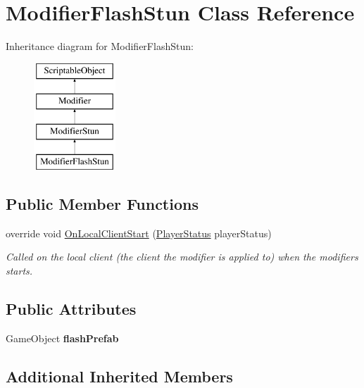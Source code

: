 \hypertarget{class_modifier_flash_stun}{}\section{Modifier\+Flash\+Stun Class Reference}
\label{class_modifier_flash_stun}
Inheritance diagram for Modifier\+Flash\+Stun\+:\begin{figure}[H]
\begin{center}
\leavevmode
\includegraphics[height=4.000000cm]{class_modifier_flash_stun}
\end{center}
\end{figure}
\subsection*{Public Member Functions}
\begin{DoxyCompactItemize}
\item 
override void \hyperlink{class_modifier_flash_stun_a27c1f1560db77c6ea9f32655113392b7}{On\+Local\+Client\+Start} (\hyperlink{class_player_status}{Player\+Status} player\+Status)
\begin{DoxyCompactList}\small\item\em Called on the local client (the client the modifier is applied to) when the modifiers starts. \end{DoxyCompactList}\end{DoxyCompactItemize}
\subsection*{Public Attributes}
\begin{DoxyCompactItemize}
\item 
\hypertarget{class_modifier_flash_stun_aa8bfd199e485e6b8e14f344968eb1ebd}{}\label{class_modifier_flash_stun_aa8bfd199e485e6b8e14f344968eb1ebd} 
Game\+Object {\bfseries flash\+Prefab}
\end{DoxyCompactItemize}
\subsection*{Additional Inherited Members}


